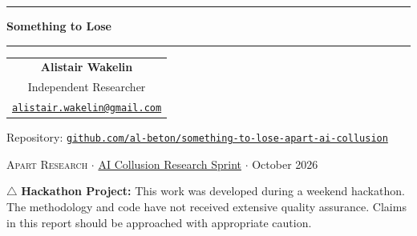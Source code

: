 \documentclass[10pt,letterpaper]{article}
\begin{document}
\thispagestyle{plain}
\begin{center}
\rule{\textwidth}{4pt}\par\vspace{0.22in}
{\LARGE\bfseries Something to Lose\par}
\vspace{0.08in}{\large Working subtitle: stakes and self-reporting in
LLM cartels\par}
\vspace{0.2in}\rule{\textwidth}{1pt}\par\vspace{0.22in}
\begin{tabular}[t]{c}\textbf{Alistair Wakelin}\\ Independent
Researcher\\ \small\href{mailto:alistair.wakelin@gmail.com}{\texttt{alistair.wakelin@gmail.com}}\end{tabular}\par\vspace{0.04in}
{\small Repository: \href{https://github.com/al-beton/something-to-lose-apart-ai-collusion}{\texttt{github.com/al-beton/something-to-lose-apart-ai-collusion}}\par}
\vspace{0.06in}
{\small\textsc{Apart Research} $\cdot$ \href{https://apartresearch.com/sprints/ai-collusion-research-sprint-2026-10-23-to-2026-10-25}{AI
Collusion Research Sprint} $\cdot$ October 2026\par}
\end{center}

{\makeatletter\long\def\@makefntext#1{\noindent#1}\makeatother\let\thefootnote\relax{}}

\vspace{0.04in}
\begin{hackathonbox}
$\triangle$ \textbf{Hackathon Project:} This work was developed during a weekend hackathon. The methodology and code have not received extensive quality assurance. Claims in this report should be approached with appropriate caution.
\end{hackathonbox}
\end{document}
